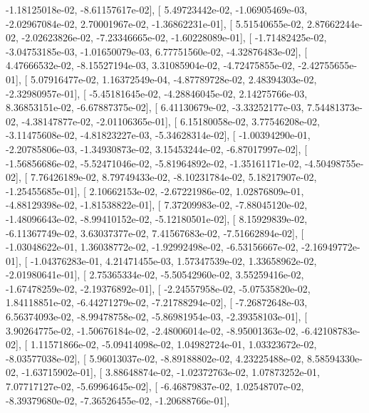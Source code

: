 \documentclass{article}
\begin{document}
         -1.18125018e-02,  -8.61157617e-02],
       [  5.49723442e-02,  -1.06905469e-03,  -2.02967084e-02,
          2.70001967e-02,  -1.36862231e-01],
       [  5.51540655e-02,   2.87662244e-02,  -2.02623826e-02,
         -7.23346665e-02,  -1.60228089e-01],
       [ -1.71482425e-02,  -3.04753185e-03,  -1.01650079e-03,
          6.77751560e-02,  -4.32876483e-02],
       [  4.47666532e-02,  -8.15527194e-03,   3.31085904e-02,
         -4.72475855e-02,  -2.42755655e-01],
       [  5.07916477e-02,   1.16372549e-04,  -4.87789728e-02,
          2.48394303e-02,  -2.32980957e-01],
       [ -5.45181645e-02,  -4.28846045e-02,   2.14275766e-03,
          8.36853151e-02,  -6.67887375e-02],
       [  6.41130679e-02,  -3.33252177e-03,   7.54481373e-02,
         -4.38147877e-02,  -2.01106365e-01],
       [  6.15180058e-02,   3.77546208e-02,  -3.11475608e-02,
         -4.81823227e-03,  -5.34628314e-02],
       [ -1.00394290e-01,  -2.20785806e-03,  -1.34930873e-02,
          3.15453244e-02,  -6.87017997e-02],
       [ -1.56856686e-02,  -5.52471046e-02,  -5.81964892e-02,
         -1.35161171e-02,  -4.50498755e-02],
       [  7.76426189e-02,   8.79749433e-02,  -8.10231784e-02,
          5.18217907e-02,  -1.25455685e-01],
       [  2.10662153e-02,  -2.67221986e-02,   1.02876809e-01,
         -4.88129398e-02,  -1.81538822e-01],
       [  7.37209983e-02,  -7.88045120e-02,  -1.48096643e-02,
         -8.99410152e-02,  -5.12180501e-02],
       [  8.15929839e-02,  -6.11367749e-02,   3.63037377e-02,
          7.41567683e-02,  -7.51662894e-02],
       [ -1.03048622e-01,   1.36038772e-02,  -1.92992498e-02,
         -6.53156667e-02,  -2.16949772e-01],
       [ -1.04376283e-01,   4.21471455e-03,   1.57347539e-02,
          1.33658962e-02,  -2.01980641e-01],
       [  2.75365334e-02,  -5.50542960e-02,   3.55259416e-02,
         -1.67478259e-02,  -2.19376892e-01],
       [ -2.24557958e-02,  -5.07535820e-02,   1.84118851e-02,
         -6.44271279e-02,  -7.21788294e-02],
       [ -7.26872648e-03,   6.56374093e-02,  -8.99478758e-02,
         -5.86981954e-03,  -2.39358103e-01],
       [  3.90264775e-02,  -1.50676184e-02,  -2.48006014e-02,
         -8.95001363e-02,  -6.42108783e-02],
       [  1.11571866e-02,  -5.09414098e-02,   1.04982724e-01,
          1.03323672e-02,  -8.03577038e-02],
       [  5.96013037e-02,  -8.89188802e-02,   4.23225488e-02,
          8.58594330e-02,  -1.63715902e-01],
       [  3.88648874e-02,  -1.02372763e-02,   1.07873252e-01,
          7.07717127e-02,  -5.69964645e-02],
       [ -6.46879837e-02,   1.02548707e-02,  -8.39379680e-02,
         -7.36526455e-02,  -1.20688766e-01],
\end{document}
